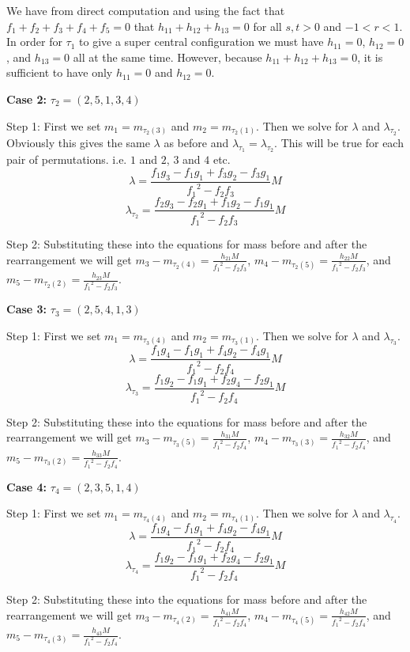 \documentclass[11pt,leqno]{article}
\theoremstyle{definition}
\theoremstyle{remark}
\numberwithin{equation}{section}
\begin{document}
We have from direct computation and using the fact that $f_1+f_2+f_3+f_4+f_5=0$ that $h_{11}+h_{12}+h_{13}=0$ for all $s,t > 0$ and $-1<r<1$. In order for $\tau_1$ to give a super central configuration we must have $h_{11}=0$, $h_{12}=0$, and $h_{13}=0$ all at the same time. However, because $h_{11}+h_{12}+h_{13}=0$, it is sufficient to have only $h_{11}=0$ and $h_{12}=0$.

\textbf{Case 2:} $\tau_2=(2,5,1,3,4)$

Step 1: First we set $m_1=m_{\tau_2(3)}$ and $m_2=m_{\tau_2(1)}$. Then we solve for $\lambda$ and $\lambda_{\tau_2}$. Obviously this gives the same $\lambda$ as before and $\lambda_{\tau_1}=\lambda_{\tau_2}$. This will be true for each pair of permutations. i.e. $1$ and $2$, $3$ and $4$ etc.
$$\lambda=\frac{f_1g_3-f_1g_1+f_3g_2-f_3g_1}{{f_1}^2-f_2f_3}M$$
$$\lambda_{\tau_2}=\frac{f_2g_3-f_2g_1+f_1g_2-f_1g_1}{{f_1}^2-f_2f_3}M$$

Step 2: Substituting these into the equations for mass before and after the rearrangement we will get $m_3-m_{\tau_2(4)}=\frac{h_{21}M}{{f_1}^2-f_2f_3}$, $m_4-m_{\tau_2(5)}=\frac{h_{22}M}{{f_1}^2-f_2f_3}$, and $m_5-m_{\tau_2(2)}=\frac{h_{23}M}{{f_1}^2-f_2f_3}$.

\textbf{Case 3:} $\tau_3=(2,5,4,1,3)$

Step 1: First we set $m_1=m_{\tau_3(4)}$ and $m_2=m_{\tau_3(1)}$. Then we solve for $\lambda$ and $\lambda_{\tau_3}$. 
$$\lambda=\frac{f_1g_4-f_1g_1+f_4g_2-f_4g_1}{{f_1}^2-f_2f_4}M$$
$$\lambda_{\tau_3}=\frac{f_1g_2-f_1g_1+f_2g_4-f_2g_1}{{f_1}^2-f_2f_4}M$$

Step 2: Substituting these into the equations for mass before and after the rearrangement we will get $m_3-m_{\tau_3(5)}=\frac{h_{31}M}{{f_1}^2-f_2f_4}$, $m_4-m_{\tau_3(3)}=\frac{h_{32}M}{{f_1}^2-f_2f_4}$, and $m_5-m_{\tau_3(2)}=\frac{h_{33}M}{{f_1}^2-f_2f_4}$.

\textbf{Case 4:} $\tau_4=(2,3,5,1,4)$

Step 1: First we set $m_1=m_{\tau_4(4)}$ and $m_2=m_{\tau_4(1)}$. Then we solve for $\lambda$ and $\lambda_{\tau_4}$. 
$$\lambda=\frac{f_1g_4-f_1g_1+f_4g_2-f_4g_1}{{f_1}^2-f_2f_4}M$$
$$\lambda_{\tau_4}=\frac{f_1g_2-f_1g_1+f_2g_4-f_2g_1}{{f_1}^2-f_2f_4}M$$

Step 2: Substituting these into the equations for mass before and after the rearrangement we will get $m_3-m_{\tau_4(2)}=\frac{h_{41}M}{{f_1}^2-f_2f_4}$, $m_4-m_{\tau_4(5)}=\frac{h_{42}M}{{f_1}^2-f_2f_4}$, and $m_5-m_{\tau_4(3)}=\frac{h_{43}M}{{f_1}^2-f_2f_4}$.
\end{document}
